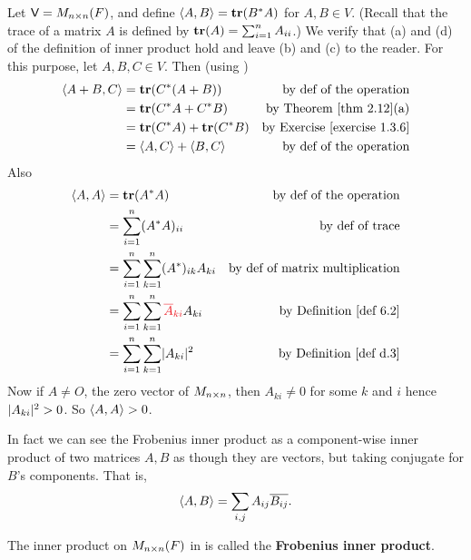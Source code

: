 \begin{example} \label{example 6.1.5}
Let \(\textsf{V} = M_{n \times n}(F)\), and define \(\left< A, B \right> = \textbf{tr}(B^* A)\) for \(A, B \in V\).
(Recall that the trace of a matrix \(A\) is defined by \(\textbf{tr}(A) = \sum_{i = 1}^n A_{ii}\).)
We verify that (a) and (d) of the definition of inner product hold and leave (b) and (c) to the reader. For this purpose, let \(A, B, C \in V\).
Then (using )
\begin{align*}
    \LG A + B, C \RG & = \TRACE(C^* (A + B)) & \text{by def of the operation} \\
        & = \TRACE(C^* A + C^* B) & \text{by \THM{2.12}(a)} \\
        & = \TRACE(C^* A) + \TRACE(C^* B) & \text{by \EXEC{1.3.6}} \\
        & = \LG A, C \RG + \LG B, C \RG & \text{by def of the operation}
\end{align*}
Also
\begin{align*}
    \LG A, A \RG & = \TRACE(A^* A) & \text{by def of the operation} \\
        & = \sum_{i = 1}^n (A^* A)_{ii} & \text{by def of trace} \\
        & = \sum_{i = 1}^n \sum_{k = 1}^n (A^*)_{ik} A_{ki} & \text{by def of matrix multiplication} \\
        & = \sum_{i = 1}^n \sum_{k = 1}^n \RED{\conjugatet{A}_{ki}} A_{ki} & \text{by \DEF{6.2}} \\
        & = \sum_{i = 1}^n \sum_{k = 1}^n \abs{A_{ki}}^2 & \text{by \DEF{d.3}}
\end{align*}
Now if \(A \ne O\), the zero vector of \(M_{n \times n}\), then \(A_{ki} \ne 0\) for some \(k\) and \(i\) hence \(\lvert A_{ki}\rvert^2 > 0\).
So \(\left< A, A \right> > 0\).
\end{example}

\begin{remark} \label{remark 6.1.5}
In fact we can see the Frobenius inner product as a component-wise inner product of two matrices \(A, B\) as though they are vectors, but taking conjugate for \(B\)'s components.
That is,
\[
    \left< A, B \right> = \sum_{i, j} A_{ij} \overline{B_{ij}}.
\]
\end{remark}

\begin{additional definition} \label{adef 6.1}
The inner product on \(M_{n \times n}(F)\) in  is called the \textbf{Frobenius inner product}.
\end{additional definition}

